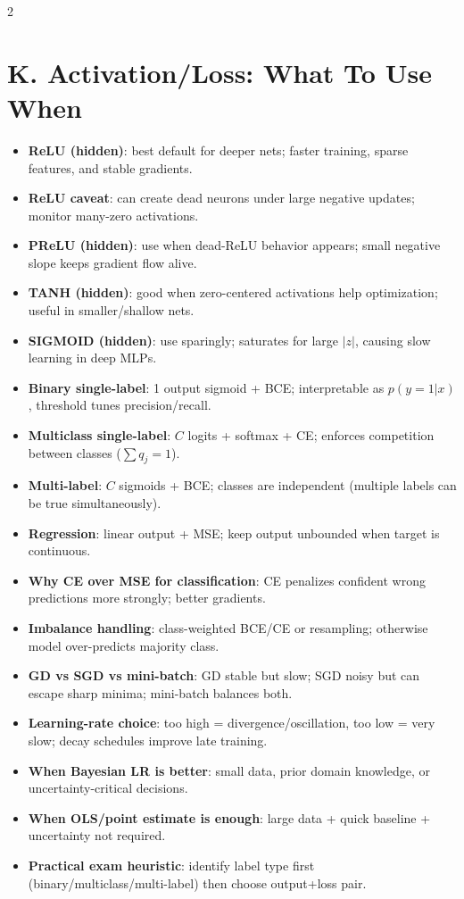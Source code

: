 \documentclass[10pt,fleqn]{article}
\begin{document}
\begin{multicols}{2}
\section*{K. Activation/Loss: What To Use When}
\begin{itemize}
  \item \textbf{ReLU (hidden)}: best default for deeper nets; faster training, sparse features, and stable gradients.
  \item \textbf{ReLU caveat}: can create dead neurons under large negative updates; monitor many-zero activations.
  \item \textbf{PReLU (hidden)}: use when dead-ReLU behavior appears; small negative slope keeps gradient flow alive.
  \item \textbf{TANH (hidden)}: good when zero-centered activations help optimization; useful in smaller/shallow nets.
  \item \textbf{SIGMOID (hidden)}: use sparingly; saturates for large \(|z|\), causing slow learning in deep MLPs.
  \item \textbf{Binary single-label}: 1 output sigmoid + BCE; interpretable as \(p(y=1|x)\), threshold tunes precision/recall.
  \item \textbf{Multiclass single-label}: \(C\) logits + softmax + CE; enforces competition between classes (\(\sum q_j=1\)).
  \item \textbf{Multi-label}: \(C\) sigmoids + BCE; classes are independent (multiple labels can be true simultaneously).
  \item \textbf{Regression}: linear output + MSE; keep output unbounded when target is continuous.
  \item \textbf{Why CE over MSE for classification}: CE penalizes confident wrong predictions more strongly; better gradients.
  \item \textbf{Imbalance handling}: class-weighted BCE/CE or resampling; otherwise model over-predicts majority class.
  \item \textbf{GD vs SGD vs mini-batch}: GD stable but slow; SGD noisy but can escape sharp minima; mini-batch balances both.
  \item \textbf{Learning-rate choice}: too high = divergence/oscillation, too low = very slow; decay schedules improve late training.
  \item \textbf{When Bayesian LR is better}: small data, prior domain knowledge, or uncertainty-critical decisions.
  \item \textbf{When OLS/point estimate is enough}: large data + quick baseline + uncertainty not required.
  \item \textbf{Practical exam heuristic}: identify label type first (binary/multiclass/multi-label) then choose output+loss pair.
\end{itemize}


\end{multicols}
\end{document}
